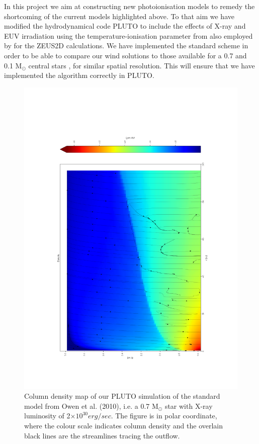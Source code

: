 \documentclass[10pt,fleqn,twoside]{article}
\begin{document}
In this project we aim at constructing new photoionisation models to
remedy the shortcoming of the current models highlighted above. To
that aim we have modified the hydrodynamical code PLUTO 
\citep{2007ApJS..170..228M, 2012A&A...545A.152M}
to include the
effects of X-ray and EUV irradiation using the temperature-ionisation
parameter from 
\citet{2008ApJ...688..398E, 2009ApJ...699.1639E}
also employed by 
\citet{2010MNRAS.401.1415O}
for the ZEUS2D calculations. We have implemented the
standard scheme in order to be able to compare our wind solutions to 
those available for a 0.7 and 0.1 M$_\odot$ central
stars 
\citep{2010MNRAS.401.1415O, 2011MNRAS.412...13O, 2012MNRAS.422.1880O},
for similar spatial
resolution. This will ensure that we have implemented the algorithm
correctly in PLUTO. 



\begin{figure}
  \includegraphics[width=0.85\linewidth, angle = 270]{dens0604.pdf}
  \caption{Column density map of our PLUTO simulation of the standard
    model from Owen et al. (2010), i.e. a 0.7 M$_{\odot}$ star with
X-ray luminosity of 2$\times 10^{30} erg/sec$. The figure is in polar coordinate,
    where the colour scale indicates column density and the overlain
    black lines are the streamlines tracing the outflow. }
  \label{fig:tstreamlines}
\end{figure}
\end{document}
